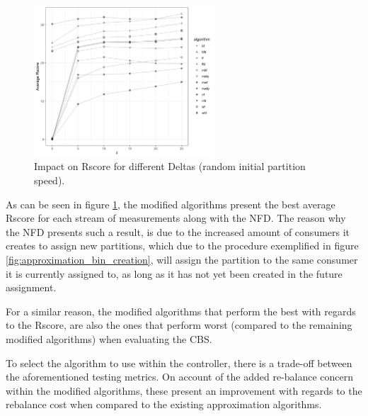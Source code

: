 \begin{figure}[htb!] 
    \centering
    \includegraphics[width=0.6\textwidth]{images/controller/Rscore.png}
    \caption{
        Impact on Rscore for different Deltas (random initial partition speed).
    } 
    \label{fig:rscore} 
\end{figure}

As can be seen in figure \ref{fig:rscore}, the modified algorithms present the
best average Rscore for each stream of measurements along with the NFD. The
reason why the NFD presents such a result, is due to the increased amount of
consumers it creates to assign new partitions, which due to the procedure
exemplified in figure \ref{fig:approximation_bin_creation}, will assign the
partition to the same consumer it is currently assigned to, as long as it has
not yet been created in the future assignment.

For a similar reason, the modified algorithms that perform the best with regards
to the Rscore, are also the ones that perform worst (compared to the remaining
modified algorithms) when evaluating the CBS.

To select the algorithm to use within the controller, there is a trade-off
between the aforementioned testing metrics. On account of the added re-balance
concern within the modified algorithms, these present an improvement with
regards to the rebalance cost when compared to the existing approximation
algorithms.

